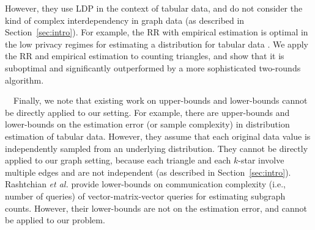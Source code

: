 However, they use LDP in the context of tabular data, and do not consider the kind of complex interdependency in graph data (as described in Section~\ref{sec:intro}). 
For example, the RR with empirical estimation is optimal in the low privacy regimes for estimating a distribution for tabular data \cite{Kairouz_ICML16,Kairouz_JMLR16}. 
We apply the RR and empirical estimation to counting triangles, and show that it is suboptimal and significantly outperformed by a more sophisticated 
two-rounds 
algorithm. 

\smallskip
{}~~Finally, we note that existing work on upper-bounds and lower-bounds cannot be directly applied to our setting. 
For example, there are upper-bounds
\cite{Acharya_AISTATS19,Kairouz_ICML16,Kairouz_JMLR16,Ye_ISIT17,Joseph_ArXiv19,Joseph_ArXiv19_Gauss} and
lower-bounds
\cite{Acharya_arXiv20,Duchi_ArXiv14,Duchi_ArXiv17,Joseph_ArXiv19,Duchi_ArXiv19,
Joseph_ArXiv19_Gauss, Joseph_SODA20} on the estimation error (or sample complexity) in 
distribution estimation of tabular data. 
However, they assume that each original data value is independently sampled from an underlying distribution. 
They cannot be directly applied to our graph setting, because each triangle and each $k$-star involve multiple edges and are not independent (as described in Section~\ref{sec:intro}). 
Rashtchian \textit{et al.} \cite{Rashtchian_arXiv20} provide lower-bounds on communication complexity (i.e., number of queries) of vector-matrix-vector queries for estimating subgraph counts. 
However, their lower-bounds are not on the estimation error, and cannot be applied to our problem.
